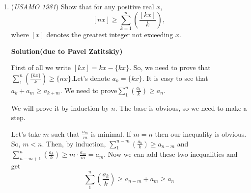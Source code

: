 \begin{enumerate}
	\item (\textit{USAMO 1981}) Show that for any positive real $x$, 
 \[[nx]\ge \sum_{k=1}^{n}\left(\frac{[kx]}{k}\right),\]
where $[x]$ denotes the greatest integer not exceeding $x$.


 



\textbf{Solution(due to Pavel Zatitskiy)}

First of all we write $[kx]=kx-\{kx\}$. So, we need to prove that$\sum_{1}^{n}\left(\frac{\{kx\}}{k}\right)\geq \{nx\}.$Let's denote $a_k=\{kx\}$. It is easy to see that $a_k+a_m \geq a_{k+m}$. We need to prove$\sum_{1}^{n}\left(\frac{a_k}{k}\right)\geq a_n.$

 We will prove it by induction by $n$. The base is obvious, so we need to make a step.

 Let's take $m$ such that $\frac{a_m}{m}$ is minimal. If $m=n$ then our inequality is obvious. So, $m<n$. Then, by induction, $\sum_{1}^{n-m}\left(\frac{a_k}{k}\right)\geq a_{n-m}$ and $\sum_{n-m+1}^{n}\left(\frac{a_k}{k}\right)\geq m\cdot \frac{a_m}{m}=a_m$. Now we can add these two inequalities and get
 \[\sum_{1}^{n}\left(\frac{a_k}{k}\right) \geq a_{n-m}+a_m \geq a_n\]



\end{enumerate}